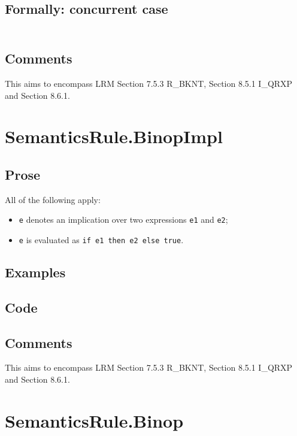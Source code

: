 \documentclass{book}
\begin{document}
  \subsection{Formally: concurrent case}
  \begin{align}
  \end{align} 

  \subsection{Comments}
  This aims to encompass LRM Section 7.5.3 R\_BKNT, Section 8.5.1 I\_QRXP and Section
  8.6.1.

\section{SemanticsRule.BinopImpl \label{sec:SemanticsRule.BinopImpl}}

  \subsection{Prose}
  All of the following apply:
  \begin{itemize}
  \item \texttt{e} denotes an implication over two expressions \texttt{e1} and \texttt{e2};
  \item \texttt{e} is evaluated as \texttt{if e1 then e2 else true}.
  \end{itemize}

  \subsection{Examples}

  \subsection{Code}

  \subsection{Comments}
  This aims to encompass LRM Section 7.5.3 R\_BKNT, Section 8.5.1 I\_QRXP and Section
  8.6.1.

\section{SemanticsRule.Binop \label{sec:SemanticsRule.Binop}}
\end{document}
